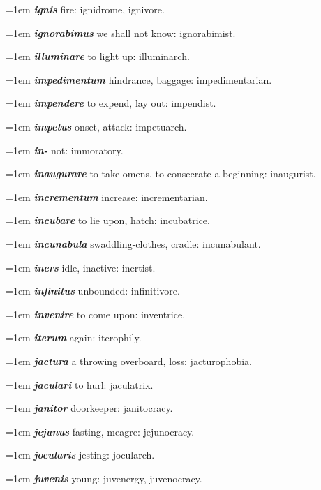 \hangindent=1em \textbf{\textit{ignis}} fire: ignidrome, ignivore.\par
\hangindent=1em \textbf{\textit{ignorabimus}} we shall not know: ignorabimist.\par
\hangindent=1em \textbf{\textit{illuminare}} to light up: illuminarch.\par
\hangindent=1em \textbf{\textit{impedimentum}} hindrance, baggage: impedimentarian.\par
\hangindent=1em \textbf{\textit{impendere}} to expend, lay out: impendist.\par
\hangindent=1em \textbf{\textit{impetus}} onset, attack: impetuarch.\par
\hangindent=1em \textbf{\textit{in-}} not: immoratory.\par
\hangindent=1em \textbf{\textit{inaugurare}} to take omens, to consecrate a beginning: inaugurist.\par
\hangindent=1em \textbf{\textit{incrementum}} increase: incrementarian.\par
\hangindent=1em \textbf{\textit{incubare}} to lie upon, hatch: incubatrice.\par
\hangindent=1em \textbf{\textit{incunabula}} swaddling-clothes, cradle: incunabulant.\par
\hangindent=1em \textbf{\textit{iners}} idle, inactive: inertist.\par
\hangindent=1em \textbf{\textit{infinitus}} unbounded: infinitivore.\par
\hangindent=1em \textbf{\textit{invenire}} to come upon: inventrice.\par
\hangindent=1em \textbf{\textit{iterum}} again: iterophily.\par
\hangindent=1em \textbf{\textit{jactura}} a throwing overboard, loss: jacturophobia.\par
\hangindent=1em \textbf{\textit{jaculari}} to hurl: jaculatrix.\par
\hangindent=1em \textbf{\textit{janitor}} doorkeeper: janitocracy.\par
\hangindent=1em \textbf{\textit{jejunus}} fasting, meagre: jejunocracy.\par
\hangindent=1em \textbf{\textit{jocularis}} jesting: jocularch.\par
\hangindent=1em \textbf{\textit{juvenis}} young: juvenergy, juvenocracy.\par
